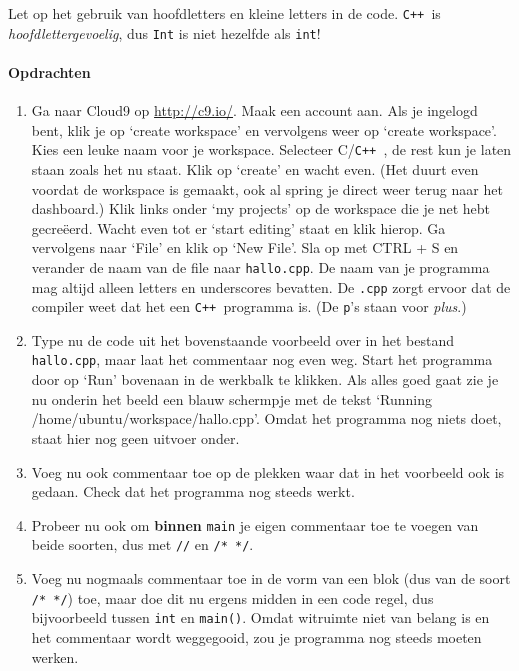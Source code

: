 \documentclass[12pt,a4paper]{article}
\newcommand{\icode}{\lstinline}
\newcommand{\mono}{\texttt}
\newcommand{\cpp}{\mono{C++ }}
\begin{document}
Let op het gebruik van hoofdletters en kleine letters in de code. \cpp is \emph{hoofdlettergevoelig}, dus \icode{Int} is niet hezelfde als \icode{int}!


\paragraph{Opdrachten}
\begin{enumerate}
	\item
		Ga naar Cloud9 op \url{http://c9.io/}. Maak een account aan. Als je ingelogd bent, klik je op `create workspace' en vervolgens weer op `create workspace'. Kies een leuke naam voor je workspace. Selecteer C/\cpp, de rest kun je laten staan zoals het nu staat. Klik op `create' en wacht even. (Het duurt even voordat de workspace is gemaakt, ook al spring je direct weer terug naar het dashboard.) Klik links onder `my projects' op de workspace die je net hebt gecreëerd. Wacht even tot er `start editing' staat en klik hierop. Ga vervolgens naar `File' en klik op `New File'. Sla op met CTRL + S en verander de naam van de file naar \mono{hallo.cpp}. De naam van je programma mag altijd alleen letters en underscores bevatten. De \mono{.cpp} zorgt ervoor dat de compiler weet dat het een \cpp programma is. (De \mono{p}'s staan voor \emph{plus}.)
		
	\item 
		Type nu de code uit het bovenstaande voorbeeld over in het bestand \mono{hallo.cpp}, maar laat het commentaar nog even weg. Start het programma door op `Run' bovenaan in de werkbalk te klikken. Als alles goed gaat zie je nu onderin het beeld een blauw schermpje met de tekst `Running /home/ubuntu/workspace/hallo.cpp'. Omdat het programma nog niets doet, staat hier nog geen uitvoer onder.
	\item
		Voeg nu ook commentaar toe op de plekken waar dat in het voorbeeld ook is gedaan. Check dat het programma nog steeds werkt.
	\item
		Probeer nu ook om \textbf{binnen} \icode{main} je eigen commentaar toe te voegen van beide soorten, dus met \icode{//} en \icode{/* */}.
	\item 
		Voeg nu nogmaals commentaar toe in de vorm van een blok (dus van de soort \icode{/* */}) toe, maar doe dit nu ergens midden in een code regel, dus bijvoorbeeld tussen \icode{int} en \icode{main()}. Omdat witruimte niet van belang is en het commentaar wordt weggegooid, zou je programma nog steeds moeten werken.
\end{enumerate}
\end{document}
